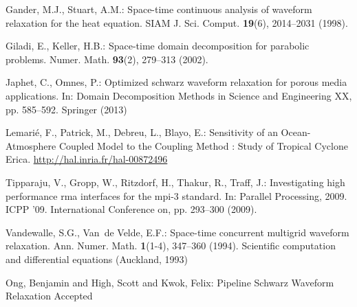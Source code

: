 \documentclass{svmult-ddm}
\begin{document}
\begin{thebibliography}{10}
Gander, M.J., Stuart, A.M.: Space-time continuous analysis of waveform
  relaxation for the heat equation.
\newblock SIAM J. Sci. Comput. \textbf{19}(6), 2014--2031 (1998).
\newblock {}

Giladi, E., Keller, H.B.: Space-time domain decomposition for parabolic
  problems.
\newblock Numer. Math. \textbf{93}(2), 279--313 (2002).
\newblock {}

Japhet, C., Omnes, P.: Optimized schwarz waveform relaxation for porous media
  applications.
\newblock In: Domain Decomposition Methods in Science and Engineering XX, pp.
  585--592. Springer (2013)

Lemari{\'e}, F., Patrick, M., Debreu, L., Blayo, E.: {Sensitivity of an
  Ocean-Atmosphere Coupled Model to the Coupling Method : Study of Tropical
  Cyclone Erica}.
\newblock \urlprefix\url{http://hal.inria.fr/hal-00872496}

Tipparaju, V., Gropp, W., Ritzdorf, H., Thakur, R., Traff, J.: Investigating
  high performance rma interfaces for the mpi-3 standard.
\newblock In: Parallel Processing, 2009. ICPP '09. International Conference on,
  pp. 293--300 (2009).
\newblock {}

Vandewalle, S.G., Van~de Velde, E.F.: Space-time concurrent multigrid waveform
  relaxation.
\newblock Ann. Numer. Math. \textbf{1}(1-4), 347--360 (1994).
\newblock Scientific computation and differential equations (Auckland, 1993)

Ong, Benjamin and High, Scott and Kwok, Felix: Pipeline Schwarz Waveform Relaxation
\newblock Accepted


\end{thebibliography}
\end{document}
